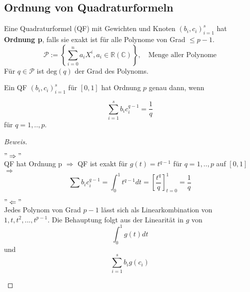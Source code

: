 \subsection{Ordnung von Quadraturformeln}

\begin{definition}
Eine Quadraturformel (QF) mit Gewichten und Knoten $(b_i, c_i)_{i=1}^{s}$ hat \textbf{Ordnung p}, falls sie exakt ist für alle Polynome von Grad $ \leq p-1$.\\
$$\mathcal{P} := \left\{ \sum_{i=0}^{n}a_iX^i, a_i \in \mathbb{R} (\mathbb{C}) \right\}, \quad \text{Menge aller Polynome}  $$
Für $q \in \mathcal{P}$ ist $\text{deg}(q)$ der Grad des Polynoms.
\end{definition}

\begin{theorem}
Ein QF $(b_i, c_i)_{i=1}^{s}$ für $[0,1]$ hat Ordnung $p$ genau dann, wenn

$$\sum_{i=1}^{s} b_i c_i^{q-1} = \frac{1}{q}$$ für $q = 1,..,p$.
\begin{proof}[Beweis]
\begin{description}
  \item
\end{description}
\begin{description}
  \item $"\Rightarrow"$ \\
  QF hat Ordnung p $\Rightarrow$ QF ist exakt für $g(t) = t^{q-1}$ für $q = 1,..,p$ auf $[0,1]$ \\
  $\Rightarrow$ $$\sum b_i c_i^{q-1} = \int_{0}^{1} t^{q-1} dt = [\frac{t^q}{q}]_{t=0}^{1} = \frac{1}{q}$$
  \item $"\Leftarrow"$\\
  Jedes Polynom von Grad $p-1$ lässt sich als Linearkombination von $1, t, t^2, ...,t^{p-1}$. Die Behauptung folgt aus der Linearität in $g$ von $$\int_{0}^{1} g(t) dt$$ und $$\sum_{i=1}^{s}b_i g(c_i)$$
\end{description}
\end{proof}
\end{theorem}


